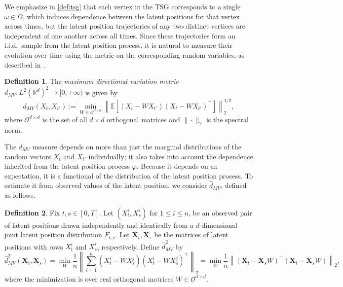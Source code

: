 \documentclass[12pt]{article}
\newcommand{\RR}{\mathbb{R}}
\newcommand{\EE}{\mathbb{E}}
\theoremstyle{definition}
\newtheorem{definition}{Definition}
\newcommand{\bX}{\mathbf{X}}
\begin{document}
We emphasize in \ref{def:tsg} that each vertex in the TSG corresponds to a single $\omega\in\Omega$, which induces dependence between the latent positions for that vertex across times, but the latent position trajectories of any two distinct vertices are independent of one another across all times. Since these trajectories form an i.i.d.\ sample from the latent position process, it is natural to measure their evolution over time using the metric on the corresponding random variables, as described in \cite{athreya2025euclidean}. 
\begin{definition}
The \emph{maximum directional variation metric} $d_{MV}:L^2(\RR^d)^2\rightarrow [0,+\infty)$ is given by
\begin{equation}
d_{MV}(X_t,X_{t'}):=\min_{W \in \mathcal{O}^{d \times d}} \left\|\EE[(X_t-WX_{t'})(X_t-WX_{t'})^\top]\right\|_2^{1/2},
\end{equation}
where $\mathcal{O}^{d\times d}$ is the set of all $d \times d$ orthogonal matrices and $\| \cdot \|_2$ is the spectral norm.
\end{definition}

The $d_{MV}$ measure depends on more than just the marginal distributions of the random vectors $X_t$ and $X_{t'}$ individually; it also takes into account the dependence inherited from the latent position process $\varphi$. Because it depends on an expectation, it is a functional of the distribution of the latent position process. To estimate it from observed values of the latent position, we consider $\hat{d}_{MV}$, defined as follows.

\begin{definition}\label{hat-dmv}
Fix $t, s \in [0, T]$. Let $(X^{i}_t, X^{i}_s)$ for $1 \leq i \leq n$, be an observed pair of latent positions drawn independently and identically from a $d$-dimensional joint latent position distribution $F_{t,s}$. Let $\bX_t, \bX_s$ be the matrices of latent positions with rows $X^{i}_t$ and $X^i_s$, respectively. Define $\hat{d}_{MV}^2$ by
$$\hat{d}_{MV}^2(\bX_t,\bX_s)=\min_W \frac{1}{n} \left\|\sum_{i=1}^n (X^{i}_t-WX^{j}_s)(X^i_t-WX^j_s)^\top\right\|_2= \min_W\frac{1}{n}\left\|(\bX_t-\bX_s W)^\top(\bX_t-\bX_s W)\right\|_2,$$
where the minimization is over real orthogonal matrices $W\in\mathcal{O}^{d\times d}$.
\end{definition}
\end{document}
